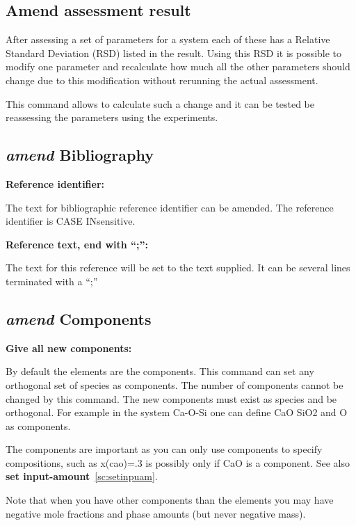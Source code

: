 \documentclass[11pt]{article}
\begin{document}
\hypertarget{Amend assess result}{}
\subsection{Amend assessment result}

After assessing a set of parameters for a system each of these has a
Relative Standard Deviation (RSD) listed in the result.  Using this
RSD it is possible to modify one parameter and recalculate how much
all the other parameters should change due to this modification
without rerunning the actual assessment.

This command allows to calculate such a change and it can be tested be
reassessing the parameters using the experiments.


\hypertarget{Amend bibliography}{}

\subsection{{\em amend} Bibliography}

{\bf Reference identifier:}

The text for bibliographic reference identifier can be amended.  The
reference identifier is CASE INsensitive.

{\bf Reference text, end with ``;'':}

The text for this reference will be set to the text supplied.  It can be
several lines terminated with a ``;''

\hypertarget{Amend components}{}
\subsection{{\em amend} Components}\label{sc:amendcomp}

{\bf Give all new components:}

By default the elements are the components.  This command can set any
orthogonal set of species as components.  The number of components
cannot be changed by this command.  The new components must exist as
species and be orthogonal.  For example in the system Ca-O-Si one can
define CaO SiO2 and O as components.

The components are important as you can only use components to
specify compositions, such as x(cao)=.3 is possibly only if CaO
is a component.  See also {\bf set input-amount}~\ref{sc:setinpuam}.

Note that when you have other components than the elements you may
have negative mole fractions and phase amounts (but never negative
mass).
\end{document}
